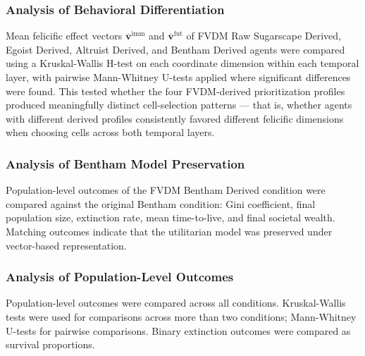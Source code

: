 \documentclass{icsthesis}
\begin{document}
\begin{mainmatter}
\subsubsection{Analysis of Behavioral Differentiation}
Mean felicific effect vectors $\bar{\mathbf{v}}^{\mathrm{imm}}$ and $\bar{\mathbf{v}}^{\mathrm{fut}}$ of FVDM Raw Sugarscape Derived, Egoist Derived, Altruist Derived, and Bentham Derived agents were compared using a Kruskal-Wallis H-test on each coordinate dimension within each temporal layer, with pairwise Mann-Whitney U-tests applied where significant differences were found. This tested whether the four FVDM-derived prioritization profiles produced meaningfully distinct cell-selection patterns --- that is, whether agents with different derived profiles consistently favored different felicific dimensions when choosing cells across both temporal layers.

\subsubsection{Analysis of Bentham Model Preservation}
Population-level outcomes of the FVDM Bentham Derived condition were compared against the original Bentham condition: Gini coefficient, final population size, extinction rate, mean time-to-live, and final societal wealth. Matching outcomes indicate that the utilitarian model was preserved under vector-based representation.

\subsubsection{Analysis of Population-Level Outcomes}
Population-level outcomes were compared across all conditions. Kruskal-Wallis tests were used for comparisons across more than two conditions; Mann-Whitney U-tests for pairwise comparisons. Binary extinction outcomes were compared as survival proportions.


\end{mainmatter}
\end{document}
